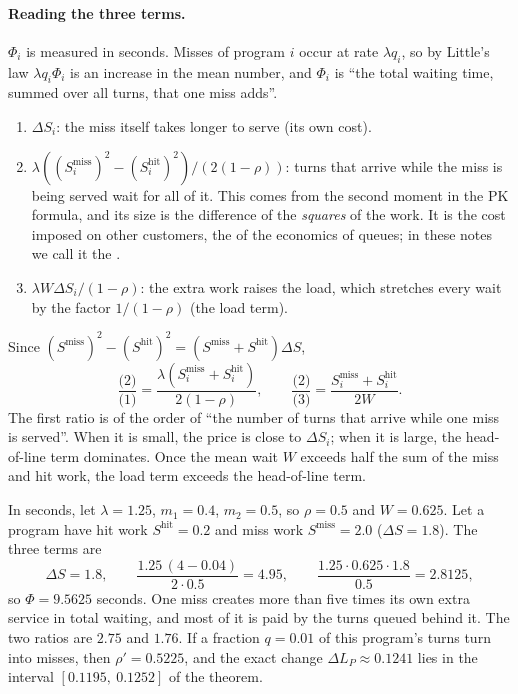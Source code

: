 \paragraph{Reading the three terms.} $\Phi_i$ is measured in seconds. Misses of
program $i$ occur at rate $\lambda q_i$, so by Little's law $\lambda q_i\Phi_i$ is
an increase in the mean number, and $\Phi_i$ is ``the total waiting time, summed
over all turns, that one miss adds''.
\begin{enumerate}[label=(\arabic*)]
\item $\Delta S_i$: the miss itself takes longer to serve (its own cost).
\item $\lambda((S^{\mathrm{miss}}_i)^2-(S^{\mathrm{hit}}_i)^2)/(2(1-\rho))$: turns
  that arrive while the miss is being served wait for all of it. This comes from
  the second moment in the PK formula, and its size is the difference of the
  \emph{squares} of the work. It is the cost imposed on other customers, the
   of the economics of queues; in these notes we call it the
  .
\item $\lambda W\Delta S_i/(1-\rho)$: the extra work raises the load, which
  stretches every wait by the factor $1/(1-\rho)$ (the load term).
\end{enumerate}
Since $(S^{\mathrm{miss}})^2-(S^{\mathrm{hit}})^2=(S^{\mathrm{miss}}+S^{\mathrm{hit}})\Delta S$,
\[
  \frac{\text{(2)}}{\text{(1)}}=\frac{\lambda(S_i^{\mathrm{miss}}+S_i^{\mathrm{hit}})}{2(1-\rho)},\qquad
  \frac{\text{(2)}}{\text{(3)}}=\frac{S_i^{\mathrm{miss}}+S_i^{\mathrm{hit}}}{2W}.
\]
The first ratio is of the order of ``the number of turns that arrive while one
miss is served''. When it is small, the price is close to $\Delta S_i$; when it is
large, the head-of-line term dominates. Once the mean wait $W$ exceeds half the
sum of the miss and hit work, the load term exceeds the head-of-line term.

\begin{example}\label{L3:ex:price}
In seconds, let $\lambda=1.25$, $m_1=0.4$, $m_2=0.5$, so $\rho=0.5$ and $W=0.625$.
Let a program have hit work $S^{\mathrm{hit}}=0.2$ and miss work
$S^{\mathrm{miss}}=2.0$ ($\Delta S=1.8$). The three terms are
\[
  \Delta S=1.8,\qquad \frac{1.25\,(4-0.04)}{2\cdot0.5}=4.95,\qquad
  \frac{1.25\cdot0.625\cdot1.8}{0.5}=2.8125,
\]
so $\Phi=9.5625$ seconds. One miss creates more than five times its own extra
service in total waiting, and most of it is paid by the turns queued behind it.
The two ratios are $2.75$ and $1.76$. If a fraction $q=0.01$ of this program's
turns turn into misses, then $\rho'=0.5225$, and the exact change
$\Delta L_P\approx0.1241$ lies in the interval $[0.1195,\ 0.1252]$ of the theorem.
\end{example}

